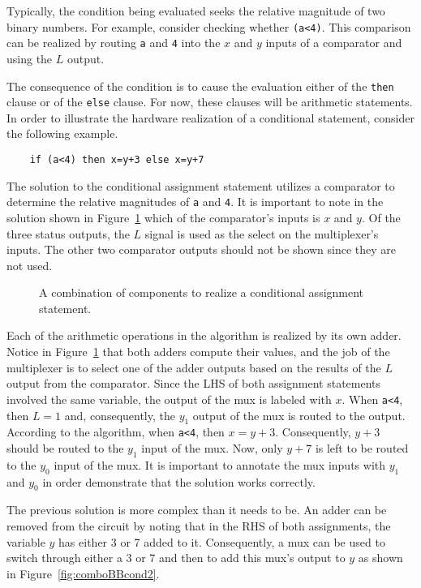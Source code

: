 Typically, the condition being evaluated seeks the relative
magnitude of two binary numbers.  For example, consider checking whether
 \verb+(a<4)+.  This comparison can be
realized by routing \verb+a+ and \verb+4+ into the $x$ and
$y$ inputs of a comparator and using the $L$ output.

The consequence of the condition is to cause the evaluation either of
the \verb+then+ clause or of the \verb+else+ clause.  For now, these 
clauses will 
be arithmetic statements.  In order to illustrate the hardware
realization of a conditional statement, consider the following
example.

\begin{verbatim}
    if (a<4) then x=y+3 else x=y+7
\end{verbatim}

The solution to the conditional assignment statement utilizes 
a comparator to determine the relative magnitudes of \verb+a+ 
and \verb+4+.  It is important to note in the solution shown in
Figure~\ref{fig:comboBBcond} which of the 
comparator's inputs is $x$ and $y$.  Of the three status outputs, 
the $L$ signal is used as the select on the multiplexer's inputs.  The 
other two comparator outputs should not be shown since they are
not used. 


\begin{figure}[ht]
\caption{A combination of components to realize a conditional assignment
statement.}
\label{fig:comboBBcond}
\end{figure}

Each of the arithmetic operations in the algorithm is realized 
by its own adder. Notice in Figure~\ref{fig:comboBBcond} that both 
adders compute their values, and the job of the multiplexer is to 
select one of the adder outputs based on the results of the $L$ output 
from the comparator.    Since the LHS of both assignment statements
involved the same variable, the output of the mux is labeled with
$x$.  When \verb+a<4+, then 
$L=1$ and, consequently, the $y_1$ output of the mux is routed to the
output.  According to the algorithm, when \verb+a<4+, then $x=y+3$.
Consequently, $y+3$ should be routed to the $y_1$ input of the mux.
Now, only $y+7$ is left to be routed to the $y_0$ input of the mux.  It is
important to annotate the mux inputs with $y_1$ and $y_0$ in order
demonstrate that the solution works correctly.

The previous solution is more complex than it needs to be. An adder
can be removed from the circuit by noting that in the RHS of both 
assignments, the variable $y$ has either 3 or 7 added to it.  
Consequently, a mux can be used to switch through either a 3 or
7 and then to add this mux's output to $y$ as shown in 
Figure~\ref{fig:comboBBcond2}.

